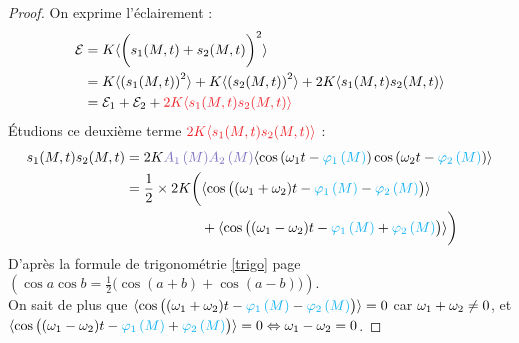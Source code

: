 \documentclass[11pt,a4paper,fleqn,pdftex]{report}
\begin{document}
\begin{proof}
On exprime l'éclairement \Epsilon : 
\begin{align*}
\Epsilon &= K \langle \bigg( \vibration[1] + \vibration[2] \bigg)^2 \rangle \\
         &= K \langle \left( \vibration[1] \right)
^2 \rangle + K \langle \left( \vibration[2] \right)
^2 \rangle + 2K\langle \vibration[1] \vibration[2] \rangle \\
         &= \Epsilon_1 + \Epsilon_2 + \textcolor{Red}{2K\langle \vibration[1] \vibration[2] \rangle}
\end{align*}
Étudions ce deuxième terme $\textcolor{Red}{2K\langle \vibration[1] \vibration[2] \rangle}$ :
\begin{align*}
\vibration[1] \vibration[2] &= 2K \amplitude[1]{M} \amplitude[2]{M}  \langle \cos \left( \pulsation[1] t - \phase[1]{M} \right)\cos \left( \pulsation[2] t - \phase[2]{M} \right)\rangle \\
    &= \frac{1}{2}\times 2 K \bigg( \langle \cos \big( (\pulsation[1] + \pulsation [2] ) t - \phase[1]{M} - \phase[2]{M} \big) \rangle \\
    &\hphantom{Here is some} + \langle \cos  \big( (\pulsation[1] - \pulsation [2] ) t - \phase[1]{M} + \phase[2]{M} \big) \rangle \bigg)
\end{align*}
D'après la formule de trigonométrie \eqref{trigo} page \pageref{trigo} $( \cos a \cos b = \frac{1}{2} \big( \cos (a+b) + \cos (a-b) \big) )$. \\
%
On sait de plus que $\langle \cos \big( (\pulsation[1] + \pulsation [2] ) t - \phase[1]{M} - \phase[2]{M} \big) \rangle = 0$ car $\pulsation[1] + \pulsation [2] \neq 0$, et $\langle \cos  \big( (\pulsation[1] - \pulsation [2] ) t - \phase[1]{M} + \phase[2]{M} \big) \rangle = 0 \Leftrightarrow \pulsation[1] - \pulsation [2] = 0 $. 
\end{proof}
%
\end{document}
